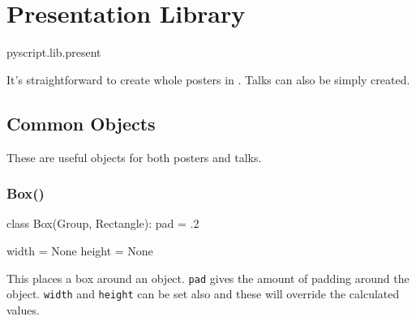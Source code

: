 % 
%
%


\chapter{Presentation Library}

\begin{python}
pyscript.lib.present
\end{python}

It's straightforward to create whole posters in \pyscript. 
Talks can also be simply created. 

\section{Common Objects}

These are useful objects for both posters and talks.

\subsection{Box()}
\begin{python}
class Box(Group, Rectangle):
    pad = .2

    width = None
    height = None
\end{python}

This places a box around an object. \Verb|pad| gives the amount of padding
around the object. \Verb|width| and \Verb|height| can be set also and these
will override the calculated values. 

